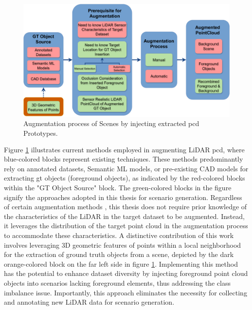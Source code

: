 \begin{figure}[htbp]
    \centering
    \includegraphics[width=1\linewidth]{97_graphics//related_work/related_work_block_diagram.pdf}
    \caption{Augmentation process of Scenes by injecting extracted \acrlong{pcd} Prototypes.}
    \label{fig:sota-related_work_block_diagram}
\end{figure}

Figure \ref{fig:sota-related_work_block_diagram} illustrates current methods employed in augmenting LiDAR \acrfull{pcd}, where blue-colored blocks represent existing techniques. These methods predominantly rely on annotated datasets, Semantic ML models, or pre-existing CAD models for extracting \acrfull{gt} objects (foreground objects), as indicated by the red-colored blocks within the "GT Object Source" block. The green-colored blocks in the figure signify the approaches adopted in this thesis for scenario generation. Regardless of certain augmentation methods \parencite{9811816, dada_2023}, this thesis does not require prior knowledge of the characteristics of the LiDAR in the target dataset to be augmented. Instead, it leverages the distribution of the target point cloud in the augmentation process to accommodate these characteristics. A distinctive contribution of this work involves leveraging 3D geometric features of points within a local neighborhood for the extraction of ground truth objects from a scene, depicted by the dark orange-colored block on the far left side in figure \ref{fig:sota-related_work_block_diagram}. Implementing this method has the potential to enhance dataset diversity by injecting foreground point cloud objects into scenarios lacking foreground elements, thus addressing the class imbalance issue. Importantly, this approach eliminates the necessity for collecting and annotating new LiDAR data for scenario generation.
